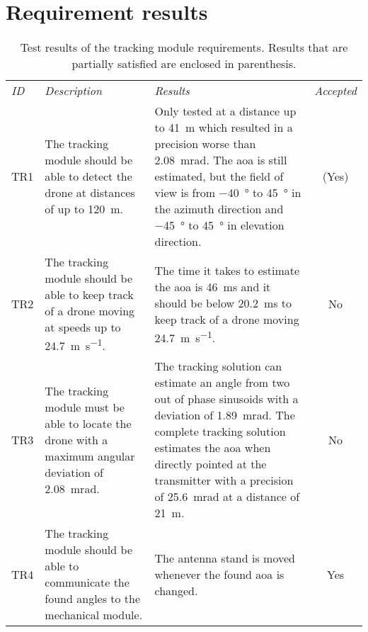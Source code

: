 \section{Requirement results} \label{sec:test_results}
\begin{table}[h]
	\centering
	\caption{Test results of the tracking module requirements. Results that are partially satisfied are enclosed in parenthesis.} \label{tab:ResultTR}
	\begin{tabularx}{\textwidth}{l X X c}
		\textit{ID}		&	\textit{Description} &\textit{Results} &\textit{Accepted} \\ \rowcolor{lightGrey} \toprule
TR1 & The tracking module should be able to detect the drone at distances of up to \SI{120}{\meter}. & Only tested at a distance up to \SI{41}{\meter} which resulted in a precision worse than \SI{2.08}{\milli\radian}. The \gls{aoa} is still estimated, but the field of view is from \SI{-40}{\degree} to \SI{45}{\degree} in the azimuth direction and \SI{-45}{\degree} to \SI{45}{\degree} in elevation direction. & (Yes) \\
TR2 & The tracking module should be able to keep track of a drone moving at speeds up to \SI{24,7}{\meter\per\second}. & The time it takes to estimate the \gls{aoa} is \SI{46}{\milli\second} and it should be below \SI{20.2}{\milli\second} to keep track of a drone moving \SI{24.7}{\meter\per\second}. & No \\ \rowcolor{lightGrey}
TR3 & The tracking module must be able to locate the drone with a maximum angular deviation of \SI{2,08}{\milli\radian}. & The tracking solution can estimate an angle from two out of phase sinusoids with a deviation of \SI{1.89}{\milli\radian}. The complete tracking solution estimates the \gls{aoa} when directly pointed at the transmitter with a precision of \SI{25.6}{\milli\radian} at a distance of \SI{21}{\meter}. & No \\ 
TR4 & The tracking module should be able to communicate the found angles to the mechanical module. & The antenna stand is moved whenever the found \gls{aoa} is changed. & Yes \\ 
	\end{tabularx}
\end{table}

